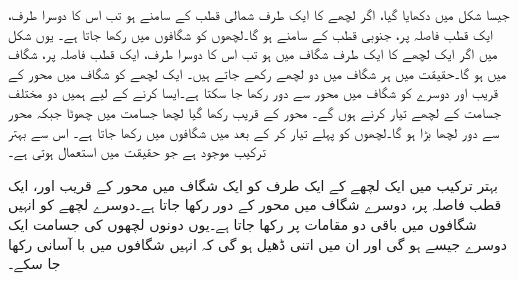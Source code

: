 جیسا شکل  میں دکھایا گیا، اگر لچھے کا ایک طرف شمالی قطب کے سامنے ہو تب اس کا دوسرا طرف، ایک قطب فاصلہ پر، جنوبی قطب کے سامنے ہو گا۔لچھوں کو شگافوں میں رکھا جاتا ہے۔ یوں شکل  میں اگر ایک لچھے کا ایک طرف شگاف  میں ہو تب اس کا دوسرا طرف، ایک قطب فاصلہ پر، شگاف  میں ہو گا۔حقیقت میں ہر شگاف میں دو لچھے رکھے جاتے ہیں۔ ایک لچھے کو شگاف میں محور کے قریب اور دوسرے کو شگاف میں محور سے دور رکھا جا سکتا ہے۔ایسا کرنے کے لیے ہمیں دو مختلف جسامت کے لچھے تیار کرنے ہوں گے۔ محور کے قریب رکھا گیا لچھا جسامت میں چھوٹا جبکہ محور سے دور لچھا بڑا ہو گا۔لچھوں کو پہلے تیار کر کے بعد میں شگافوں میں رکھا جاتا ہے۔ اس سے بہتر ترکیب موجود ہے جو حقیقت میں استعمال ہوتی ہے۔

 بہتر ترکیب میں ایک لچھے کے ایک طرف کو ایک  شگاف میں محور کے قریب اور، ایک قطب فاصلہ پر، دوسرے شگاف میں محور کے دور رکھا جاتا ہے۔دوسرے لچھے کو انہیں شگافوں میں باقی دو مقامات پر رکھا جاتا ہے۔یوں دونوں لچھوں کی جسامت ایک دوسرے جیسے ہو گی اور ان میں اتنی ڈھیل ہو گی کہ انہیں شگافوں میں با آسانی رکھا جا سکے۔

